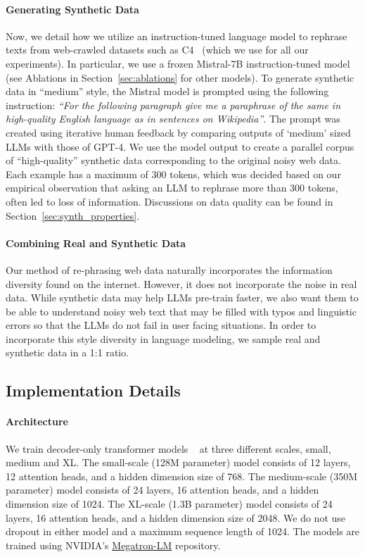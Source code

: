 \documentclass[table]{article}
\begin{document}
\paragraph{Generating Synthetic Data}
Now, we detail how we utilize an instruction-tuned language model to rephrase texts from web-crawled datasets such as C4~\citep{raffel2020exploring} (which we use for all our experiments). In particular, we use a frozen Mistral-7B instruction-tuned model~\citep{jiang2023mistral} (see Ablations in Section~\ref{sec:ablations} for other models).
To generate synthetic data in ``medium'' style, the Mistral model is prompted using the following instruction: \emph{``For the following paragraph give me a paraphrase of the same in high-quality English language as in sentences on Wikipedia''}. The prompt was created using iterative human feedback by comparing outputs of `medium' sized LLMs with those of GPT-4.
We use the model output to create a parallel corpus of ``high-quality'' synthetic data corresponding to the original noisy web data. Each example has a maximum of 300 tokens, which was decided based on our empirical observation that asking an LLM to rephrase more than 300 tokens, often led to loss of information. Discussions on data quality can be found in Section~\ref{sec:synth_properties}.
 
\paragraph{Combining Real and Synthetic Data}
Our method of re-phrasing web data naturally incorporates the information diversity found on the internet. However, it does not incorporate the noise 
in real data. While synthetic data may help LLMs pre-train faster, we also want them to be able to understand noisy web text that may be filled with typos and linguistic errors so that the LLMs do not fail in user facing situations. In order to incorporate this style diversity in language modeling, we sample real and synthetic data in a 1:1 ratio. 

\subsection{Implementation Details}
\label{sec:implementation_details}
\paragraph{Architecture}
We train decoder-only transformer models ~\citep{vaswani2017attention} at three different scales, small, medium and XL. 
The small-scale (128M parameter) model consists of 12 layers, 12 attention heads, and a hidden dimension size of 768.
The medium-scale (350M parameter) model consists of 24 layers, 16 attention heads, and a hidden dimension size of 1024.
The XL-scale (1.3B parameter) model consists of 24 layers, 16 attention heads, and a hidden dimension size of 2048.
We do not use dropout in either model and a maximum sequence length of 1024. The models are trained using NVIDIA's \href{https://github.com/NVIDIA/Megatron-LM}{Megatron-LM} repository.
\end{document}

